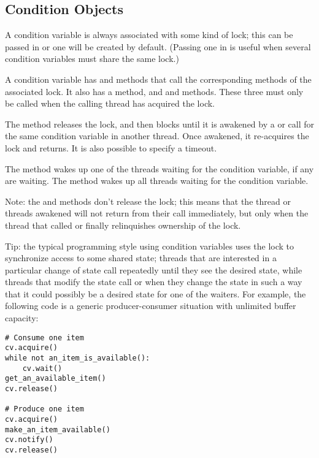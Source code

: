 \subsection{Condition Objects \label{condition-objects}}

A condition variable is always associated with some kind of lock;
this can be passed in or one will be created by default.  (Passing
one in is useful when several condition variables must share the
same lock.)

A condition variable has  and 
methods that call the corresponding methods of the associated lock.
It also has a  method, and  and
 methods.  These three must only be called when
the calling thread has acquired the lock.

The  method releases the lock, and then blocks until it
is awakened by a  or  call for
the same condition variable in another thread.  Once awakened, it
re-acquires the lock and returns.  It is also possible to specify a
timeout.

The  method wakes up one of the threads waiting for
the condition variable, if any are waiting.  The 
method wakes up all threads waiting for the condition variable.

Note: the  and  methods don't
release the lock; this means that the thread or threads awakened will
not return from their  call immediately, but only when
the thread that called  or 
finally relinquishes ownership of the lock.

Tip: the typical programming style using condition variables uses the
lock to synchronize access to some shared state; threads that are
interested in a particular change of state call 
repeatedly until they see the desired state, while threads that modify
the state call  or  when they
change the state in such a way that it could possibly be a desired
state for one of the waiters.  For example, the following code is a
generic producer-consumer situation with unlimited buffer capacity:

\begin{verbatim}
# Consume one item
cv.acquire()
while not an_item_is_available():
    cv.wait()
get_an_available_item()
cv.release()

# Produce one item
cv.acquire()
make_an_item_available()
cv.notify()
cv.release()
\end{verbatim}

